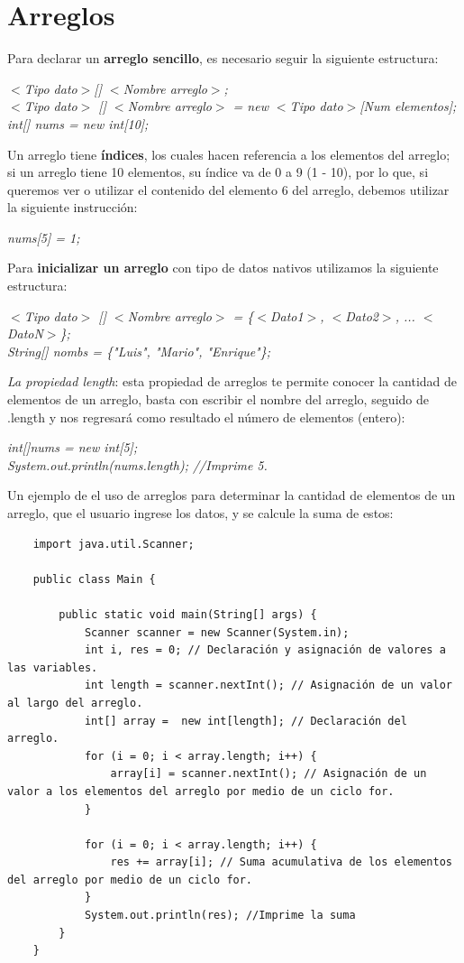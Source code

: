 \section{Arreglos}
\hspace{0.55cm}Para declarar un \textbf{arreglo sencillo}, es necesario seguir la siguiente estructura:
\begin{center}
	\textit{
		$<$Tipo dato$>$[] $<$Nombre arreglo$>$; \\
		$<$Tipo dato$>$ [] $<$Nombre arreglo$>$ = new $<$Tipo dato$>$[Num elementos]; \\
		int[] nums = new int[10];
	}
\end{center}

Un arreglo tiene \textbf{índices}, los cuales hacen referencia a los elementos del arreglo; si un arreglo tiene 10 elementos, su índice va de 0 a 9 (1 - 10), por lo que, si queremos ver o utilizar el contenido del elemento 6 del arreglo, debemos utilizar la siguiente instrucción:
\begin{center}
	\textit{nums[5] = 1;}
\end{center}

Para \textbf{inicializar un arreglo} con tipo de datos nativos utilizamos la siguiente estructura:
\begin{center}
	\textit{
		$<$Tipo dato$>$ [] $<$Nombre arreglo$>$ = \{$<$Dato1$>$, $<$Dato2$>$, ... $<$DatoN$>$\}; \\
		String[] nombs = \{"Luis", "Mario", "Enrique"\};
	}
\end{center}

\textit{La propiedad \textit{length}}: esta propiedad de arreglos te permite conocer la cantidad de elementos de un arreglo, basta con escribir el nombre del arreglo, seguido de .length y nos regresará como resultado el número de elementos (entero):
\begin{center}
	\textit{
		int[]nums = new int[5]; \\
		System.out.println(nums.length); //Imprime 5.
	}
\end{center}

Un ejemplo de el uso de arreglos para determinar la cantidad de elementos de un arreglo, que el usuario ingrese los datos, y se calcule la suma de estos:
\begin{lstlisting}
    import java.util.Scanner;

    public class Main {

		public static void main(String[] args) {
			Scanner scanner = new Scanner(System.in);
			int i, res = 0; // Declaración y asignación de valores a las variables.
			int length = scanner.nextInt(); // Asignación de un valor al largo del arreglo.
			int[] array =  new int[length]; // Declaración del arreglo.
			for (i = 0; i < array.length; i++) {
				array[i] = scanner.nextInt(); // Asignación de un valor a los elementos del arreglo por medio de un ciclo for.
			}

			for (i = 0; i < array.length; i++) {
				res += array[i]; // Suma acumulativa de los elementos del arreglo por medio de un ciclo for.
			}
			System.out.println(res); //Imprime la suma
        }
    }
\end{lstlisting}


